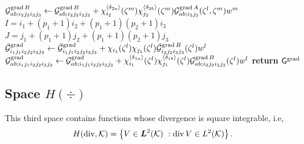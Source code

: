 \begin{algorithm}[ht!]
\begin{algorithmic}
                        \State$\mathcal{G}_{ab;i_2j_2i_3j_3}^{\operatorname{grad} B}\gets \mathcal{G}_{ab;i_2j_2i_3j_3}^{\operatorname{grad} B}+ \chi_{i_2}^{\langle\delta_{2a}\rangle}(\zeta^m)\chi_{j_2}^{\langle\delta_{2b}\rangle}(\zeta^m)\mathcal{G}_{ab;i_3j_3}^{\operatorname{grad} A}(\zeta^l,\zeta^m)w^m$ 
                    \EndFor                    
                \EndFor
            \EndFor            
                            \State $I=i_1+(p_1+1)i_2+(p_1+1)(p_2+1)i_3$
                            \State $J=j_1+(p_1+1)j_2+(p_1+1)(p_2+1)j_3$
                                \State $\bar{\mathcal{G}}^{\operatorname{grad}}_{i_1j_1i_2j_2i_3j_3}\gets \bar{\mathcal{G}}^{\operatorname{grad}}_{i_1j_1i_2j_2i_3j_3}+ \chi_{i_1}(\zeta^l)\chi_{j_1}(\zeta^l) \bar{\mathcal{G}}_{i_2j_2i_3j_3}^{\operatorname{grad} B}(\zeta^l)w^l$ \Comment{(\ref{ip_h1_GAB0})}
                                    \State $\mathcal{G}^{\operatorname{grad}}_{ab;i_1j_1i_2j_2i_3j_3}\gets \mathcal{G}^{\operatorname{grad}}_{ab;i_1j_1i_2j_2i_3j_3}+ \chi_{i_1}^{\langle\delta_{1a}\rangle}(\zeta^l)\chi_{j_1}^{\langle\delta_{1b}\rangle}(\zeta^l)
                                    \mathcal{G}_{ab;i_2j_2i_3j_3}^{\operatorname{grad} B}(\zeta^l)w^l$ \Comment{(\ref{ip_h1_GAB})}
                                \EndFor                                
                            \EndIf
                    \EndFor
            \EndFor
        \EndFor
    \EndFor
\EndFor
\State \textbf{return} $\mathsf{G}^{\operatorname{grad}}$
\EndProcedure
\end{algorithmic}
\end{algorithm}
% 
 
\subsection{Space \texorpdfstring{$H(\div)$}{H(div)}}

This third space contains functions whose divergence is square integrable, i.e,
% 
\begin{equation}
    H(\operatorname{div},\mathcal{K})=\left\{ V\in\boldsymbol{L}^2(\mathcal{K})\ :\operatorname{div} V\in L^2(\mathcal{K})\right\}.
\end{equation}


